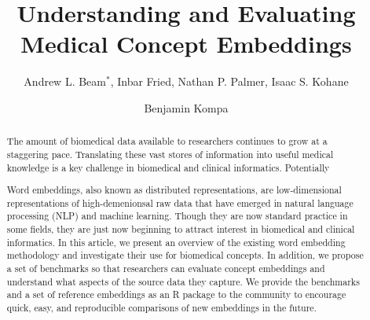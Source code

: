 \documentclass{ws-procs11x85}
\begin{document}
\title{Understanding and Evaluating Medical Concept Embeddings}

\author{Andrew L. Beam$^*$, Inbar Fried, Nathan P. Palmer, Isaac S. Kohane}

\address{Department of Biomedical Informatics, Harvard Medical School,\\
Boston, MA, 02115, USA\\
$^*$E-mail: Andrew\_Beam@hms.harvard.edu\\}

\author{Benjamin Kompa}

\address{University of North Carolina, Chapel Hill,\\
Chapel Hill, NC, 27514, USA\\
E-mail: kompa@live.unc.edu}

\begin{abstract}
The amount of biomedical data available to researchers continues to grow at a staggering pace. Translating these vast stores of information into useful medical knowledge is a key challenge in biomedical and clinical informatics. Potentially 

Word embeddings, also known as distributed representations, are low-dimensional representations of high-demenionsal raw data that have emerged in natural language processing (NLP) and machine learning. Though they are now standard practice in some fields, they are just now beginning to attract interest in biomedical and clinical informatics. In this article, we present an overview of the existing word embedding methodology and investigate their use for biomedical concepts. In addition, we propose a set of benchmarks so that researchers can evaluate concept embeddings and understand what aspects of the source data they capture. We provide the benchmarks and a set of reference embeddings as an R package to the community to encourage quick, easy, and reproducible comparisons of new embeddings in the future.
\end{abstract}


\bodymatter
\end{document}
